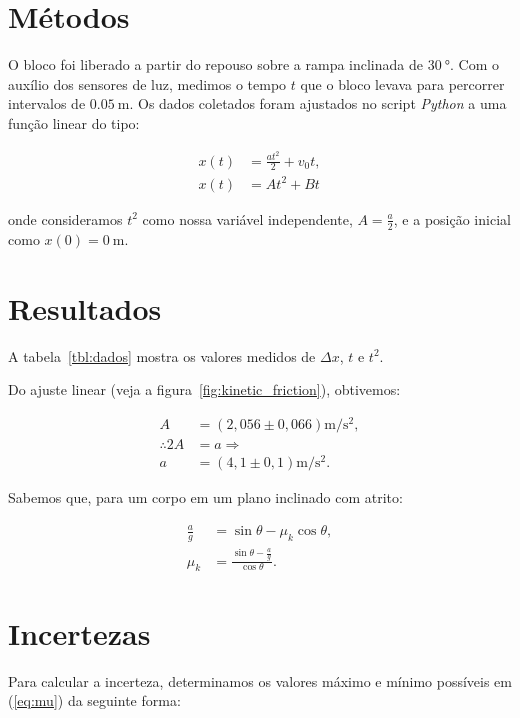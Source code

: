 \documentclass[10pt,oneside,twocolumn,a4paper]{article}
\begin{document}
\section{Métodos}

O bloco foi liberado a partir do repouso sobre a rampa inclinada de
$\SI{30}{\degree}$. Com o auxílio dos sensores de luz, medimos o tempo $t$ que
o bloco levava para percorrer intervalos de $\SI{0,05}{\metre}$. Os dados
coletados foram ajustados no script \textit{Python} a uma função linear do
tipo:

\begin{align}
	x(t) &= \frac{at^2}{2} + v_0t, \nonumber \\
	x(t) &= At^2 + Bt
\end{align}

onde consideramos $t^2$ como nossa variável independente, $A = \frac{a}{2}$, e
a posição inicial como $x(0) = \SI{0}{\meter}$.

\section{Resultados}

A tabela~\ref{tbl:dados} mostra os valores medidos de $\Delta x$, $t$ e
$t^2$.

Do ajuste linear (veja a figura~\ref{fig:kinetic_friction}), obtivemos:

\begin{align}\label{eq:accel}
	A &= \left( 2,056 \pm 0,066 \right) \si{\metre\per\second\squared}, \nonumber \\
	\therefore 2A &= a \Rightarrow \nonumber \\
	a &= \left( 4,1 \pm 0,1 \right) \si{\metre\per\second\squared}.
\end{align}

Sabemos que, para um corpo em um plano inclinado com atrito:

\begin{align}\label{eq:mu}
	\frac{a}{g} &= \sin\theta - \mu_k \cos\theta, \nonumber \\
	\mu_k &= \frac{\sin\theta - \frac{a}{g}}{\cos\theta}.
\end{align}

\section{Incertezas}

Para calcular a incerteza, determinamos os valores máximo e mínimo possíveis em
(\ref{eq:mu}) da seguinte forma:
\end{document}
